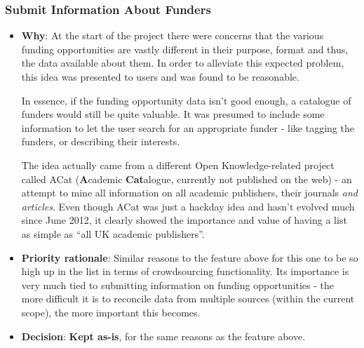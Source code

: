 \subsubsection{Submit Information About Funders}
\begin{itemize}
 \item \textbf{Why}: At the start of the project there were concerns that the various funding opportunities are vastly different in their purpose, format and thus, the data available about them. In order to alleviate this expected problem, this idea was presented to users and was found to be reasonable.
 
 In essence, if the funding opportunity data isn't good enough, a catalogue of funders would still be quite valuable. It was presumed to include some information to let the user search for an appropriate funder - like tagging the funders, or describing their interests.
 
 The idea actually came from a different Open Knowledge-related project called ACat (\textbf{A}cademic \textbf{Cat}alogue, currently not published on the web) - an attempt to mine all information on all academic publishers, their journals \emph{and articles}. Even though ACat was just a hackday idea and hasn't evolved much since June 2012, it clearly showed the importance and value of having a list as simple as ``all UK academic publishers''.
 
 \item \textbf{Priority rationale}: Similar reasons to the feature above for this one to be so high up in the list in terms of crowdsourcing functionality. Its importance is very much tied to submitting information on funding opportunities - the more difficult it is to reconcile data from multiple sources (within the current scope), the more important this becomes.
 \item \textbf{Decision}: \textbf{Kept as-is}, for the same reasons as the feature above.
\end{itemize}

